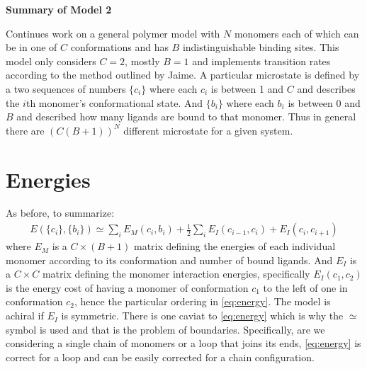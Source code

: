 \documentclass[11pt]{article}
\newcommand\set[1]{\ensuremath{\{#1\}}}
\begin{document}
\begin{center}
    \LARGE
    \textbf{Summary of Model 2}
    \vspace{1em}
\end{center}

Continues work on a general polymer model with $N$ monomers each of which can be in one of $C$ conformations and has $B$ indistinguishable binding sites.
This model only considers $C=2$, mostly $B=1$ and implements transition rates according to the method outlined by Jaime.
A particular microstate is defined by a two sequences of numbers $\set{c_i}$ where each $c_i$ is between 1 and $C$ and describes the $i$th monomer's conformational state.
And $\set{b_i}$ where each $b_i$ is between 0 and $B$ and described how many ligands are bound to that monomer.
Thus in general there are $(C(B+1))^N$ different microstate for a given system.

\section{Energies}\label{sec:energies}
As before, to summarize:
\begin{align}\label{eq:energy}
    E(\set{c_i}, \set{b_i}) \simeq \sum_i E_M(c_i, b_i) + \frac{1}{2} \sum_i E_I(c_{i-1}, c_i) + E_I(c_i, c_{i+1})
\end{align}
where $E_M$ is a $C{\times}(B+1)$ matrix defining the energies of each individual monomer according to its conformation and number of bound ligands.
And $E_I$ is a $C{\times}C$ matrix defining the monomer interaction energies, specifically $E_I(c_1, c_2)$ is the energy cost of having a monomer of conformation $c_1$ to the left of one in conformation $c_2$, hence the particular ordering in \cref{eq:energy}.
The model is achiral if $E_I$ is symmetric.
There is one caviat to \cref{eq:energy} which is why the $\simeq$ symbol is used and that is the problem of boundaries.
Specifically, are we considering a single chain of monomers or a loop that joins its ends, \cref{eq:energy} is correct for a loop and can be easily corrected for a chain configuration.
\end{document}
